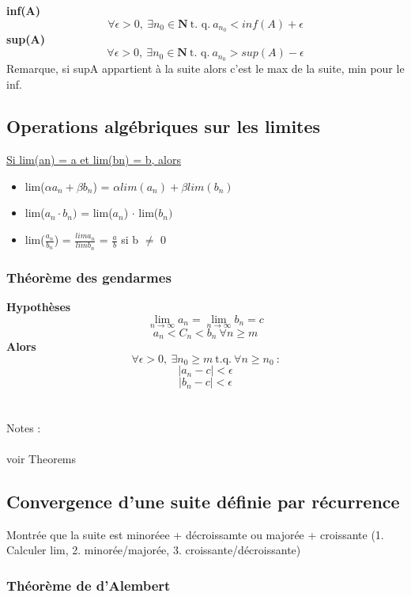 \documentclass{article}
\begin{document}
\textbf{inf(A)}\\
\[ \forall \epsilon > 0,\ \exists n_0 \in \mathbf{N}\ \text{t. q.}\ a_{n_0} < inf(A) + \epsilon \]
\textbf{sup(A)}\\
\[ \forall \epsilon > 0,\ \exists n_0 \in \mathbf{N}\ \text{t. q.}\ a_{n_0} > sup(A) - \epsilon \]
Remarque, si supA appartient à la suite alors c'est le max de la suite, min pour le inf.

\subsection{Operations algébriques sur les limites}
\underline{Si lim(an) = a et lim(bn) = b, alors}\\
\begin{itemize}
    \item lim($\alpha a_n + \beta b_n$) = $\alpha lim(a_n) + \beta lim(b_n)$
    \item lim($a_n \cdot b_n)$ = lim($a_n$) $\cdot$ lim($b_n)$
    \item lim($\frac{a_n}{b_n}$) = $\frac{lima_n}{limb_n}$ = $\frac{a}{b}$ si b $\neq$ 0
\end{itemize}
\subsubsection{Théorème des gendarmes}

\textbf{Hypothèses} \\
\[ \lim_{n\to\infty}a_n = \lim_{n\to\infty}b_n = c \]
\[ a_n < C_n < b_n\ \forall n \geq m \]
\textbf{Alors} \\

\[ \forall \epsilon > 0,\ \exists n_0 \geq m\ \text{t.q.}\ \forall n \geq n_0\ \text{:} \]
\[ \lvert a_n - c \lvert < \epsilon \]
\[ \lvert b_n - c \lvert < \epsilon \] \\\\
Notes :\\\\
voir Theorems
\subsection{Convergence d'une suite définie par récurrence}
Montrée que la suite est minoréee + décroissamte ou majorée + croissante
(1. Calculer lim, 2. minorée/majorée, 3. croissante/décroissante)

\subsubsection{Théorème de d'Alembert}
\end{document}
